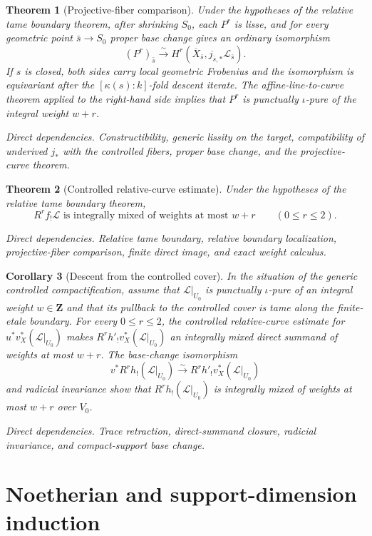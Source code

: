 \documentclass[10pt]{article}
\newtheorem{theorem}{Theorem}[section]
\newtheorem{corollary}[theorem]{Corollary}
\theoremstyle{definition}
\newcommand{\dep}[1]{\par\smallskip\noindent\textit{Direct dependencies.} #1\par}
\begin{document}
\begin{theorem}[Projective-fiber comparison]
Under the hypotheses of the relative tame boundary theorem, after shrinking
\(S_0\), each \(P^r\) is lisse, and for every geometric
point \(\bar s\to S_0\) proper base change gives an ordinary isomorphism
\[
 (P^r)_{\bar s}\xrightarrow{\sim}
 H^r(\overline X_{\bar s},j_{\bar s,*}\mathcal L_{\bar s}).
\]
If \(s\) is closed, both sides carry local geometric Frobenius and the
isomorphism is equivariant after the
\([\kappa(s):k]\)-fold descent iterate.
The affine-line-to-curve theorem applied to the right-hand side implies
that \(P^r\) is punctually \(\iota\)-pure of the integral weight \(w+r\).
\dep{Constructibility, generic lissity on the target, compatibility of
underived \(j_*\) with the controlled fibers, proper base change, and the
projective-curve theorem.}
\end{theorem}

\begin{theorem}[Controlled relative-curve estimate]
Under the hypotheses of the relative tame boundary theorem,
\[
                     R^rf_!\mathcal L
       \text{ is integrally mixed of weights at most }w+r
       \qquad(0\le r\le2).
\]
\dep{Relative tame boundary, relative boundary localization,
projective-fiber comparison, finite direct image, and exact weight
calculus.}
\end{theorem}

\begin{corollary}[Descent from the controlled cover]
In the situation of the generic controlled compactification, assume that
\(\mathcal L|_{U_0}\) is punctually \(\iota\)-pure of an integral weight
\(w\in\mathbf Z\) and that its pullback to the controlled cover is tame
along the finite-etale boundary.  For every \(0\leq r\leq2\), the controlled
relative-curve estimate for
\(u^*v_X^*(\mathcal L|_{U_0})\) makes
\(R^rh'_!v_X^*(\mathcal L|_{U_0})\) an integrally mixed direct summand of
weights at most \(w+r\).
The base-change isomorphism
\[
 v^*R^rh_!(\mathcal L|_{U_0})
 \xrightarrow{\sim}
 R^rh'_!v_X^*(\mathcal L|_{U_0})
\]
and radicial invariance show that
\(R^rh_!(\mathcal L|_{U_0})\) is integrally mixed of weights at most
\(w+r\) over \(V_0\).
\dep{Trace retraction, direct-summand closure, radicial invariance, and
compact-support base change.}
\end{corollary}

\section{Noetherian and support-dimension induction}
\end{document}
